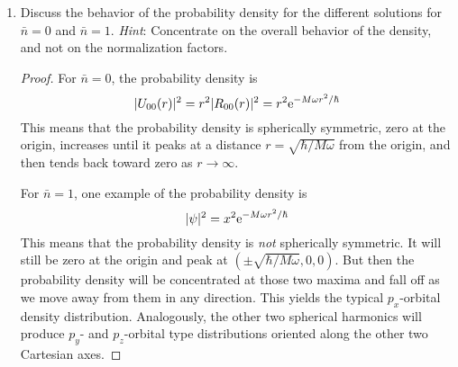 \documentclass[../psets.tex]{subfiles}
\begin{document}
\begin{enumerate}
\begin{enumerate}
\begin{proof}
\begin{align*}
            \end{align*}
            \begin{align*}
                r\e[-M\omega r^2/2\hbar]\cos\theta &= [r\cos\theta]\e[-M\omega r^2/2\hbar]\\
                \Aboxed{r\e[-M\omega r^2/2\hbar]\cos\theta &= z\e[-M\omega r^2/2\hbar]}
            \end{align*}
            \begin{align*}
                r\e[-M\omega r^2/2\hbar]\sin\theta\e[-i\phi] &= [r\sin\theta(\cos\phi-i\sin\phi)]\e[-M\omega r^2/2\hbar]\\
                &= [r\sin\theta\cos\phi-ir\sin\theta\sin\phi]\e[-M\omega r^2/2\hbar]\\
                &= [x-iy]\e[-M\omega r^2/2\hbar]\\
                \Aboxed{r\e[-M\omega r^2/2\hbar]\sin\theta\e[-i\phi] &= (x\e[-M\omega r^2/2\hbar])-i(y\e[-M\omega r^2/2\hbar])}
            \end{align*}
        \end{proof}
        \item Discuss the behavior of the probability density for the different solutions for $\bar{n}=0$ and $\bar{n}=1$. \emph{Hint}: Concentrate on the overall behavior of the density, and not on the normalization factors.
        \begin{proof}
            For $\bar{n}=0$, the probability density is
            \begin{equation*}
                |U_{00}(r)|^2 = r^2|R_{00}(r)|^2
                = r^2\e[-M\omega r^2/\hbar]
            \end{equation*}
            This means that the probability density is spherically symmetric, zero at the origin, increases until it peaks at a distance $r=\sqrt{\hbar/M\omega}$ from the origin, and then tends back toward zero as $r\to\infty$.\par
            For $\bar{n}=1$, one example of the probability density is
            \begin{equation*}
                |\psi|^2 = x^2\e[-M\omega r^2/\hbar]
            \end{equation*}
            This means that the probability density is \emph{not} spherically symmetric. It will still be zero at the origin and peak at $(\pm\sqrt{\hbar/M\omega},0,0)$. But then the probability density will be concentrated at those two maxima and fall off as we move away from them in any direction. This yields the typical $p_x$-orbital density distribution. Analogously, the other two spherical harmonics will produce $p_y$- and $p_z$-orbital type distributions oriented along the other two Cartesian axes.

\end{proof}
\end{enumerate}
\end{enumerate}
\end{document}
